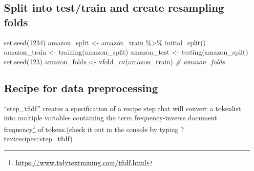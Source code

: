 \documentclass[
]{article}
\newenvironment{Shaded}{}{}
\newcommand{\CommentTok}[1]{\textcolor[rgb]{0.38,0.63,0.69}{\textit{#1}}}
\newcommand{\DecValTok}[1]{\textcolor[rgb]{0.25,0.63,0.44}{#1}}
\newcommand{\FunctionTok}[1]{\textcolor[rgb]{0.02,0.16,0.49}{#1}}
\newcommand{\NormalTok}[1]{#1}
\newcommand{\OtherTok}[1]{\textcolor[rgb]{0.00,0.44,0.13}{#1}}
\newcommand{\SpecialCharTok}[1]{\textcolor[rgb]{0.25,0.44,0.63}{#1}}
\DeclareRobustCommand{\href}[2]{#2\footnote{\url{#1}}}
\begin{document}
\hypertarget{split-into-testtrain-and-create-resampling-folds}{%
\subsection{Split into test/train and create resampling
folds}\label{split-into-testtrain-and-create-resampling-folds}}

\begin{Shaded}
\begin{Highlighting}[]
\FunctionTok{set.seed}\NormalTok{(}\DecValTok{1234}\NormalTok{)}
\NormalTok{amazon\_split }\OtherTok{\textless{}{-}}\NormalTok{ amazon\_train }\SpecialCharTok{\%\textgreater{}\%}
    \FunctionTok{initial\_split}\NormalTok{()}
\NormalTok{amazon\_train }\OtherTok{\textless{}{-}} \FunctionTok{training}\NormalTok{(amazon\_split)}
\NormalTok{amazon\_test }\OtherTok{\textless{}{-}} \FunctionTok{testing}\NormalTok{(amazon\_split)}
\FunctionTok{set.seed}\NormalTok{(}\DecValTok{123}\NormalTok{)}
\NormalTok{amazon\_folds }\OtherTok{\textless{}{-}} \FunctionTok{vfold\_cv}\NormalTok{(amazon\_train)}
\CommentTok{\# amazon\_folds}
\end{Highlighting}
\end{Shaded}

\hypertarget{recipe-for-data-preprocessing}{%
\subsection{Recipe for data
preprocessing}\label{recipe-for-data-preprocessing}}

``step\_tfidf'' creates a specification of a recipe step that will
convert a tokenlist into multiple variables containing the
\href{https://www.tidytextmining.com/tfidf.html}{term frequency-inverse
document frequency} of tokens.(check it out in the console by typing
?textrecipes::step\_tfidf)
\end{document}
